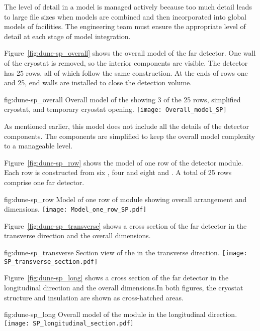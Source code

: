 The level of detail in a model is managed actively because too much
detail leads to large file sizes when models are combined and then
incorporated into global models of facilities. The 
engineering team must ensure the appropriate level of detail at each
stage of model integration.


Figure~\ref{fig:dune-sp_overall} shows the overall model of the
 far detector. One wall of the cryostat is removed, so the
interior components are visible. The detector has 25 rows, all of
which follow the same construction. At the ends of rows one and 25,
end walls are installed to close the detection volume.
\begin{dunefigure}{fig:dune-sp_overall}
  {Overall model of the  showing 3 of the 25 rows,
    simplified cryostat,  and temporary cryostat opening.}
  \texttt{[image: Overall\_model\_SP]}
\end{dunefigure}
As mentioned earlier, this model does not include all the details of
the detector components. The components are simplified to keep the
overall model complexity to a manageable level.


Figure~\ref{fig:dune-sp_row} shows the model of one row of the
detector module. Each row is constructed from six , four
 and eight  and . A total of 25 rows
comprise one  far detector.
\begin{dunefigure}{fig:dune-sp_row}
  {Model of one row of  module showing overall arrangement and dimensions.}
  \texttt{[image: Model\_one\_row\_SP.pdf]}
\end{dunefigure}


Figure~\ref{fig:dune-sp_transverse} shows a cross section of the
 far detector in the transverse direction and the overall
dimensions.
\begin{dunefigure}{fig:dune-sp_transverse}
  {Section view of the  in the transverse
    direction.}
  \texttt{[image: SP\_transverse\_section.pdf]}
\end{dunefigure}
Figure~\ref{fig:dune-sp_long} shows a cross section of the
 far detector in the longitudinal direction and the overall
dimensions.In both figures, the cryostat structure and insulation are shown
as cross-hatched areas.
\begin{dunefigure}{fig:dune-sp_long}
  {Overall model of the  module in the longitudinal direction.}
  \texttt{[image: SP\_longitudinal\_section.pdf]}
\end{dunefigure}



